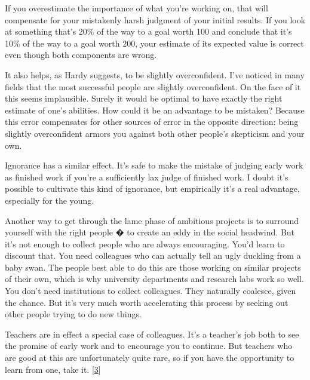                   If you overestimate the importance of what you're working on,
                  that will compensate for your mistakenly harsh judgment of
                  your initial results. If you look at something that's 20\% of
                  the way to a goal worth 100 and conclude that it's 10\% of the
                  way to a goal worth 200, your estimate of its expected value
                  is correct even though both components are wrong.

It
                  also helps, as Hardy suggests, to be slightly overconfident.
                  I've noticed in many fields that the most successful people
                  are slightly overconfident. On the face of it this seems
                  implausible. Surely it would be optimal to have exactly the
                  right estimate of one's abilities. How could it be an
                  advantage to be mistaken? Because this error compensates for
                  other sources of error in the opposite direction: being
                  slightly overconfident armors you against both other people's
                  skepticism and your own.

Ignorance has a similar
                  effect. It's safe to make the mistake of judging early work as
                  finished work if you're a sufficiently lax judge of finished
                  work. I doubt it's possible to cultivate this kind of
                  ignorance, but empirically it's a real advantage, especially
                  for the young.

Another way to get through the lame
                  phase of ambitious projects is to surround yourself with the
                  right people � to create an eddy in the social headwind. But
                  it's not enough to collect people who are always encouraging.
                  You'd learn to discount that. You need colleagues who can
                  actually tell an ugly duckling from a baby swan. The people
                  best able to do this are those working on similar projects of
                  their own, which is why university departments and research
                  labs work so well. You don't need institutions to collect
                  colleagues. They naturally coalesce, given the chance. But
                  it's very much worth accelerating this process by seeking out
                  other people trying to do new things.

Teachers are
                  in effect a special case of colleagues. It's a teacher's job
                  both to see the promise of early work and to encourage you to
                  continue. But teachers who are good at this are unfortunately
                  quite rare, so if you have the opportunity to learn from one,
                  take it.
                  [\href{\#f3n}{3}]

